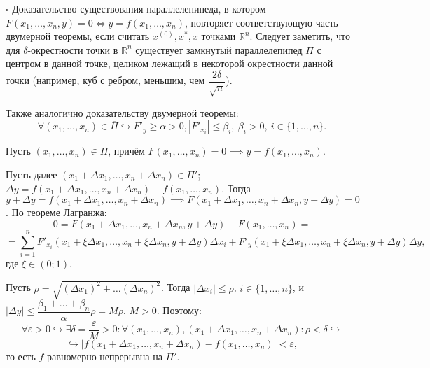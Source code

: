 \documentclass[12pt, a4paper, reqno]{article}
\begin{document}
    $\square$
    Доказательство существования параллелепипеда, в котором $F(x_1, \ldots, x_n, y) = 0 \iff
    y = f(x_1, \ldots, x_n)$, повторяет соответствующую часть двумерной теоремы, если считать
    $x^{(0)}, x^*, x$ точками $\mathbb{R}^n$. Следует заметить, что для $\delta$-окрестности точки
    в $\mathbb{R}^n$ существует замкнутый параллелепипед $\overline{\Pi} $ с центром в данной точке,
    целиком лежащий в некоторой окрестности данной точки (например, куб с ребром, меньшим, чем
    $\dfrac{2\delta}{\sqrt{n}}$).

    Также аналогично доказательству двумерной теоремы:
    \begin{equation*}
        \forall (x_1, \ldots, x_n) \in \overline{\Pi} \hookrightarrow F'_y \geq \alpha > 0,
        |F'_{x_i}| \leq \beta_i,\ \beta_i > 0,\ i \in \{1, \ldots, n\}.
    \end{equation*}

    Пусть $(x_1, \ldots, x_n) \in \Pi$, причём $F(x_1, \ldots, x_n) = 0 \implies y = f(x_1, \ldots, x_n)$.

    Пусть далее $(x_1 + \Delta x_1, \ldots, x_n + \Delta x_n) \in \Pi'$;
    $\Delta y = f(x_1 + \Delta x_1, \ldots, x_n + \Delta x_n) - f(x_1, \ldots, x_n)$. Тогда
    $y + \Delta y = f(x_1 + \Delta x_1, \ldots, x_n + \Delta x_n) \implies
    F(x_1 + \Delta x_1, \ldots, x_n + \Delta x_n, y + \Delta y) = 0$. По теореме Лагранжа:
    \begin{equation*}
        0 = F(x_1 + \Delta x_1, \ldots, x_n + \Delta x_n, y + \Delta y) - F(x_1, \ldots, x_n) =
    \end{equation*}
    \begin{equation*}
        = \sum\limits_{i = 1}^{n} F'_{x_i}(x_1 + \xi\Delta x_1, \ldots, x_n + \xi\Delta x_n, y + \Delta y)\Delta x_i +
        F'_y(x_1 + \xi\Delta x_1, \ldots, x_n + \xi\Delta x_n, y + \Delta y)\Delta y,
    \end{equation*}
    где $\xi \in (0; 1)$.

    Пусть $\rho = \sqrt{(\Delta x_1)^2 + \ldots (\Delta x_n)^2}$. Тогда $|\Delta x_i| \leq \rho$,
    $i \in \{1, \ldots, n\}$, и $|\Delta y| \leq \dfrac{\beta_1 + \ldots + \beta_n}{\alpha}\rho = M\rho$,
    $M > 0$. Поэтому:
    \begin{equation*}
        \forall \varepsilon > 0 \hookrightarrow \exists \delta = \frac{\varepsilon}{M} > 0:
        \forall (x_1, \ldots, x_n), (x_1 + \Delta x_1, \ldots, x_n + \Delta x_n):
        \rho < \delta \hookrightarrow
    \end{equation*}
    \begin{equation*}
        \hookrightarrow |f(x_1 + \Delta x_1, \ldots, x_n + \Delta x_n) -
        f(x_1, \ldots, x_n)| < \varepsilon,
    \end{equation*}
    то есть $f$ равномерно непрерывна на $\Pi'$.
\end{document}
